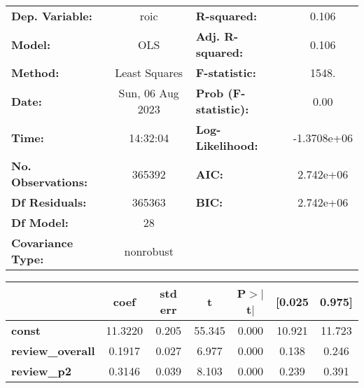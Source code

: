 \begin{center}
\begin{tabular}{lclc}
\toprule
\textbf{Dep. Variable:}                                               &       roic       & \textbf{  R-squared:         } &      0.106   \\
\textbf{Model:}                                                       &       OLS        & \textbf{  Adj. R-squared:    } &      0.106   \\
\textbf{Method:}                                                      &  Least Squares   & \textbf{  F-statistic:       } &      1548.   \\
\textbf{Date:}                                                        & Sun, 06 Aug 2023 & \textbf{  Prob (F-statistic):} &      0.00    \\
\textbf{Time:}                                                        &     14:32:04     & \textbf{  Log-Likelihood:    } & -1.3708e+06  \\
\textbf{No. Observations:}                                            &      365392      & \textbf{  AIC:               } &  2.742e+06   \\
\textbf{Df Residuals:}                                                &      365363      & \textbf{  BIC:               } &  2.742e+06   \\
\textbf{Df Model:}                                                    &          28      & \textbf{                     } &              \\
\textbf{Covariance Type:}                                             &    nonrobust     & \textbf{                     } &              \\
\bottomrule
\end{tabular}
\begin{tabular}{lcccccc}
                                                                      & \textbf{coef} & \textbf{std err} & \textbf{t} & \textbf{P$> |$t$|$} & \textbf{[0.025} & \textbf{0.975]}  \\
\midrule
\textbf{const}                                                        &      11.3220  &        0.205     &    55.345  &         0.000        &       10.921    &       11.723     \\
\textbf{review\_overall}                                              &       0.1917  &        0.027     &     6.977  &         0.000        &        0.138    &        0.246     \\
\textbf{review\_p2}                                                   &       0.3146  &        0.039     &     8.103  &         0.000        &        0.239    &        0.391     \\

\end{tabular}
\end{center}
